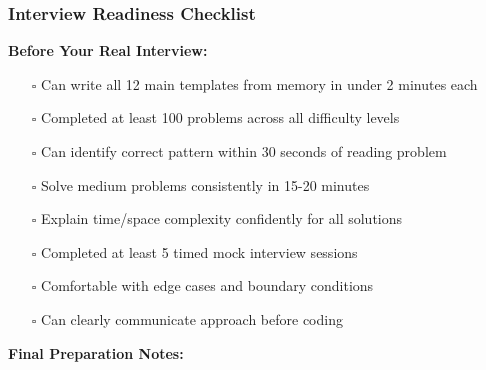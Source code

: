 \documentclass[10pt,a4paper]{article}
\begin{document}
\subsubsection{Interview Readiness Checklist}

\textbf{Before Your Real Interview:}
\begin{itemize}
\item[$\square$] Can write all 12 main templates from memory in under 2 minutes each
\item[$\square$] Completed at least 100 problems across all difficulty levels
\item[$\square$] Can identify correct pattern within 30 seconds of reading problem
\item[$\square$] Solve medium problems consistently in 15-20 minutes
\item[$\square$] Explain time/space complexity confidently for all solutions
\item[$\square$] Completed at least 5 timed mock interview sessions
\item[$\square$] Comfortable with edge cases and boundary conditions
\item[$\square$] Can clearly communicate approach before coding
\end{itemize}

\textbf{Final Preparation Notes:}\\
\end{document}
